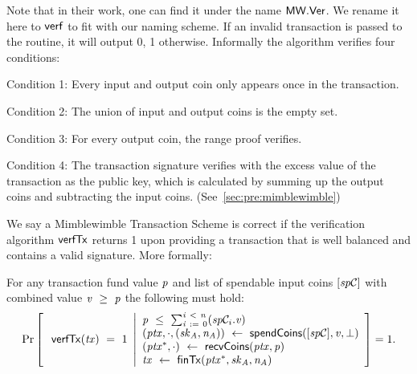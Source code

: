 \begin{definition}
\begin{asparaitem}
        Note that in their work, one can find it under the name $\mathsf{MW.Ver}$.
        We rename it here to $\mathsf{verf}$ to fit with our naming scheme.
        If an invalid transaction is passed to the routine, it will output 0, 1 otherwise.
        Informally the algorithm verifies four conditions:
        \begin{asparaenum}
            \item Condition 1: Every input and output coin only appears once in the transaction.
            \item Condition 2: The union of input and output coins is the empty set.
            \item Condition 3: For every output coin, the range proof verifies.
            \item Condition 4: The transaction signature verifies with the excess value of the transaction as the public key, which is calculated by summing up the output coins and subtracting the input coins. (See~\cref{sec:pre:mimblewimble})
        \end{asparaenum}
    \end{asparaitem}
\end{definition}

We say a Mimblewimble Transaction Scheme is correct if the verification algorithm $\mathsf{verfTx}$ returns 1 upon providing a transaction that is well balanced and contains a valid signature.
More formally:
\begin{definition}
    \label{def:atom:tx-scheme-correctness}
    For any transaction fund value $\mathit{p}$ and list of spendable input coins $[\mathit{sp}\mathcal{C}]$ with combined value $\mathit{v} ~\geq~ \mathit{p}$ the following must hold:
    \[
        \Pr\left[
        \begin{array}{c}
            \: \mathsf{verfTx}(\mathit{tx}) ~=~ 1
        \end{array}
        \middle\vert
        \begin{array}{l}
            \mathit{p} ~\leq~ \sum_{\mathit{i} ~:=~ 0}^{\mathit{i} ~<~ \mathit{n}}(\mathit{sp}\mathcal{C}_{i}.\mathit{v}) \\
            (\mathit{ptx}, \cdot, (\mathit{sk}_{\mathit{A}}, \mathit{\mathit{n}_{\mathit{A}}})) ~\leftarrow~ \mathsf{spendCoins}([\mathit{sp}\mathcal{C}],\mathit{v},\bot) \\
            (\mathit{ptx}^*, \cdot) ~\leftarrow~ \mathsf{recvCoins}(\mathit{ptx},\mathit{p}) \\
            \mathit{tx} ~\leftarrow~ \mathsf{finTx}(\mathit{ptx}^*,\mathit{sk}_{\mathit{A}},\mathit{\mathit{n}_{\mathit{A}}})
        \end{array}
        \right]=1.
    \]
\end{definition}

